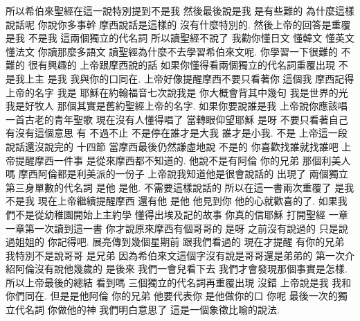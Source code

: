 \documentclass{book}
\begin{document}
所以希伯來聖經在這一說特別提到不是我 然後最後說是我 是有些難的 為什麼這樣說話呢 你說你多事幹 摩西說話是這樣的 沒有什麼特別的.
然後上帝的回答是重覆是我 不是我 這兩個獨立的代名詞 所以讀聖經不說了 我勸你懂日文 懂韓文 懂英文 懂法文 你讀那麼多語文 讀聖經為什麼不去學習希伯來文呢.
你學習一下很難的 不難的 很有興趣的 上帝跟摩西說的話 如果你懂得看兩個獨立的代名詞重覆出現 不是我上主 是我 我與你的口同在.
上帝好像提醒摩西不要只看著你 這個我 摩西記得上帝的名字 我是 耶穌在約翰福音七次說我是 你大概會背其中幾句 我是世界的光 我是好牧人 那個其實是舊約聖經上帝的名字.
如果你要說誰是我 上帝說你應該唱一首古老的青年聖歌 現在沒有人懂得唱了 當轉眼仰望耶穌 是呀 不要只看著自己 有沒有這個意思 有 不過不止 不是停在誰才是大我 誰才是小我.
不是 上帝這一段說話還沒說完的 十四節 當摩西最後仍然謙虛地說 不是的 你喜歡找誰就找誰吧 上帝提醒摩西一件事 是從來摩西都不知道的.
他說不是有阿倫 你的兄弟 那個利美人嗎 摩西阿倫都是利美派的一份子 上帝說我知道他是很會說話的 出現了 兩個獨立第三身單數的代名詞 是他 是他.
不需要這樣說話的 所以在這一書兩次重覆了 是我 不是我 現在上帝繼續提醒摩西 還有他 是他 他見到你 他的心就歡喜的了.
如果我們不是從幼稚園開始上主約學 懂得出埃及記的故事 你真的信耶穌 打開聖經 一章一章第一次讀到這一書 你才說原來摩西有個哥哥的 是呀 之前沒有說過的 只是說過姐姐的 你記得吧.
展亮傳到幾個星期前 跟我們看過的 現在才提醒 有你的兄弟 我特別不是說哥哥 是兄弟 因為希伯來文這個字沒有說是哥哥還是弟弟的 第一次介紹阿倫沒有說他幾歲的 是後來 我們一會兒看下去 我們才會發現那個事實是怎樣.
所以上帝最後的總結 看到嗎 三個獨立的代名詞再重覆出現 沒錯 上帝說是我 我和你們同在.
但是是他阿倫 你的兄弟 他要代表你 是他做你的口 你呢 最後一次的獨立代名詞 你做他的神 我們明白意思了 這是一個象徵比喻的說法.
\end{document}
